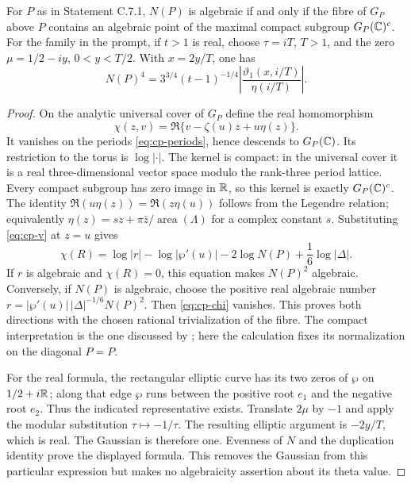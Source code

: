 \begin{statement}
For $P$ as in Statement C.7.1, $N(P)$ is algebraic if and only
if the fibre of $G_P$ above $P$ contains an algebraic point of
the maximal compact subgroup $G_P(\mathbb C)^c$.
For the family in the prompt, if $t>1$ is real, choose
$\tau=iT$, $T>1$, and the zero $\mu=1/2-iy$, $0<y<T/2$.
With $x=2y/T$, one has
\[
 N(P)^4=3^{3/4}(t-1)^{-1/4}
       \left|\frac{\vartheta_1(x,i/T)}{\eta(i/T)}\right|.
\]
\end{statement}
\begin{proof}
On the analytic universal cover of $G_P$ define the real
homomorphism
\[
 \chi(z,v)=\Re\{v-\zeta(u)z+u\eta(z)\}.
\]
It vanishes on the periods \eqref{eq:cp-periods}, hence descends
to $G_P(\mathbb C)$. Its restriction to the torus is $\log|\cdot|$.
The kernel is compact: in the universal cover it is a real
three-dimensional vector space modulo the rank-three period
lattice. Every compact subgroup has zero image in $\mathbb R$, so
this kernel is exactly $G_P(\mathbb C)^c$.
The identity
$\Re(u\eta(z))=\Re(z\eta(u))$ follows from the Legendre relation;
equivalently $\eta(z)=sz+\pi\bar z/\operatorname{area}(\Lambda)$
for a complex constant $s$. Substituting
\eqref{eq:cp-v} at $z=u$ gives
\begin{equation}\label{eq:cp-chi}
 \chi(R)=\log|r|-\log|\wp'(u)|
            -2\log N(P)+\frac16\log|\Delta|.
\end{equation}
If $r$ is algebraic and $\chi(R)=0$, this equation makes
$N(P)^2$ algebraic. Conversely, if $N(P)$ is algebraic,
choose the positive real algebraic number
$r=|\wp'(u)|\,|\Delta|^{-1/6}N(P)^2$.
Then \eqref{eq:cp-chi} vanishes. This proves both directions
with the chosen rational trivialization of the fibre.
The compact interpretation is the one discussed by
\citet[slides 5--8]{bertrand2017}; here the calculation fixes
its normalization on the diagonal $P=P$.

For the real formula, the rectangular elliptic curve has its
two zeros of $\wp$ on $1/2+i\mathbb R$; along that edge $\wp$ runs
between the positive root $e_1$ and the negative root $e_2$.
Thus the indicated representative exists. Translate $2\mu$
by $-1$ and apply the modular substitution $\tau\mapsto-1/\tau$.
The resulting elliptic argument is $-2y/T$, which is real.
The Gaussian is therefore one. Evenness of $N$ and the
duplication identity prove the displayed formula. This removes
the Gaussian from this particular expression but makes no
algebraicity assertion about its theta value.
\end{proof}

